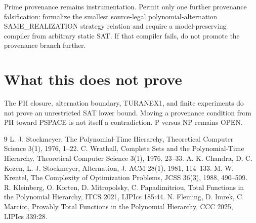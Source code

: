 \documentclass[11pt]{article}
\begin{document}
Prime provenance remains instrumentation. Permit only one further provenance falsification:
formalize the smallest source-legal polynomial-alternation SAME\_REALIZATION strategy relation and
require a model-preserving compiler from arbitrary static SAT. If that compiler fails, do not
promote the provenance branch further.

\section*{What this does not prove}
The PH closure, alternation boundary, TURANEX1, and finite experiments do not prove an unrestricted
SAT lower bound. Moving a provenance condition from PH toward PSPACE is not itself a contradiction.
P versus NP remains OPEN.

\begin{thebibliography}{9}
 L. J. Stockmeyer, The Polynomial-Time Hierarchy,
Theoretical Computer Science 3(1), 1976, 1--22.
 C. Wrathall, Complete Sets and the Polynomial-Time Hierarchy,
Theoretical Computer Science 3(1), 1976, 23--33.
 A. K. Chandra, D. C. Kozen, L. J. Stockmeyer,
Alternation, J. ACM 28(1), 1981, 114--133.
 M. W. Krentel, The Complexity of Optimization Problems,
JCSS 36(3), 1988, 490--509.
 R. Kleinberg, O. Korten, D. Mitropolsky, C. Papadimitriou,
Total Functions in the Polynomial Hierarchy, ITCS 2021, LIPIcs 185:44.
 N. Fleming, D. Imrek, C. Marciot,
Provably Total Functions in the Polynomial Hierarchy, CCC 2025, LIPIcs 339:28.
\end{thebibliography}
\end{document}
